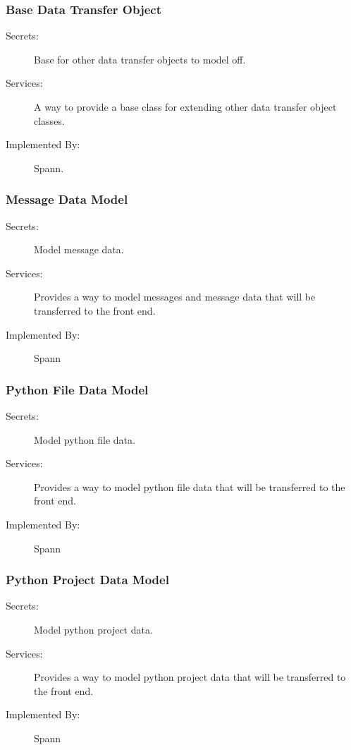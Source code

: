 \documentclass[12pt, titlepage]{article}
\begin{document}
\subsubsection{Base Data Transfer Object} \label{mdBaseDTO} 

\begin{description}
\item[Secrets:] Base for other data transfer objects to model off.
\item[Services:] A way to provide a base class for extending other data
    transfer object classes.
\item[Implemented By:] Spann.
\end{description}

\subsubsection{Message Data Model} \label{mdMessageDataModel}

\begin{description}
\item[Secrets:] Model message data.
\item[Services:] Provides a way to model messages and message data that will be
    transferred to the front end.
\item[Implemented By:] Spann
\end{description}

\subsubsection{Python File Data Model} \label{mdPythonFileDM} 

\begin{description}
\item[Secrets:] Model python file data.
\item[Services:] Provides a way to model python file data that will be transferred to the front end.
\item[Implemented By:] Spann
\end{description}

\subsubsection{Python Project Data Model} \label{mdPythonProjectDM}

\begin{description}
\item[Secrets:] Model python project data.
\item[Services:] Provides a way to model python project data that will be transferred to the front end.
\item[Implemented By:] Spann
\end{description}
\end{document}
